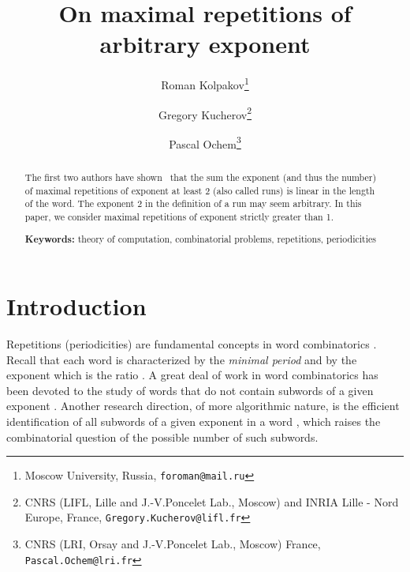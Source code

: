 \documentclass[11pt]{article}
\begin{document}

\title{On maximal repetitions of arbitrary exponent}

\author{Roman Kolpakov\thanks{Moscow University, Russia, {\tt foroman@mail.ru}}
\and Gregory Kucherov\thanks{CNRS (LIFL, Lille and J.-V.Poncelet Lab., Moscow) and INRIA Lille - Nord Europe, France, {\tt Gregory.Kucherov@lifl.fr}} 
\and Pascal Ochem\thanks{CNRS (LRI, Orsay and J.-V.Poncelet Lab., Moscow) France, {\tt Pascal.Ochem@lri.fr}}
}



\maketitle

\begin{abstract}
The first two authors have shown~\cite{KolpakovKucherovFCT99,KolpakovKucherovJDA00} that the sum the exponent (and thus the number) of
maximal repetitions of exponent at least 2 (also called runs) is linear in the length of the word.
The exponent 2 in the definition of a run may seem arbitrary. 
In this paper, we consider maximal repetitions of exponent strictly greater than 1.

{\bf Keywords:} theory of computation, combinatorial problems, repetitions, periodicities
\end{abstract}


\section{Introduction}

Repetitions (periodicities) are fundamental concepts in word
combinatorics \cite{Lothaire83,ChofKarh97handbook,KolpakovKucherovLothaire04}. Recall
that each word  is characterized by the {\em minimal period}
 and by the exponent  which is the ratio . A
great deal of work in word combinatorics has been devoted to the study of
words that do not contain subwords of a given exponent
\cite{ChofKarh97handbook}. Another research direction, of more
algorithmic nature, is the efficient identification of all subwords of
a given exponent in a word \cite{KolpakovKucherovLothaire04}, which
raises the combinatorial question of the possible number of such
subwords. 
\end{document}
